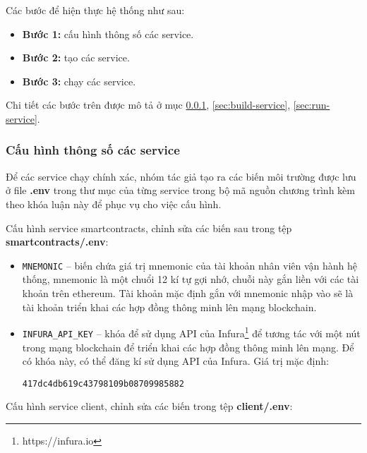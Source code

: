 \documentclass[../main-report.tex]{subfiles}
\begin{document}
Các bước để hiện thực hệ thống như sau:

\begin{itemize}
\item \textbf{Bước 1:} cấu hình thông số các \gls{service}.
\item \textbf{Bước 2:} tạo các \gls{service}.
\item \textbf{Bước 3:} chạy các \gls{service}.
\end{itemize}

Chi tiết các bước trên được mô tả ở mục \ref{sec:configure-service}, \ref{sec:build-service}, \ref{sec:run-service}.

\subsubsection{Cấu hình thông số các service}
\label{sec:configure-service}
Để các service chạy chính xác, nhóm tác giả tạo ra các biến môi trường được lưu ở file \textbf{.env} trong thư mục của từng service trong bộ mã nguồn chương trình kèm theo khóa luận này để phục vụ cho việc cấu hình.

Cấu hình service smartcontracts, chỉnh sửa các biến sau trong tệp \textbf{smartcontracts/.env}:

\begin{itemize}
\item \texttt{MNEMONIC} -- biến chứa giá trị mnemonic của tài khoản nhân viên vận hành hệ thống, mnemonic là một chuổi 12 kí tự gợi nhớ, chuỗi này gắn liền với các tài khoản trên ethereum. Tài khoản mặc định gắn với mnemonic nhập vào sẽ là tài khoản triển khai các hợp đồng thông minh lên mạng blockchain.
\item \texttt{INFURA\_API\_KEY} -- khóa để sử dụng API của Infura\footnote{https://infura.io} để tương tác với một nút trong mạng blockchain để triển khai các hợp đồng thông minh lên mạng. Để có khóa này, có thể đăng kí sử dụng API của Infura. Giá trị mặc định: 

\begin{lstlisting}
417dc4db619c43798109b08709985882
\end{lstlisting}
\end{itemize}

Cấu hình service client, chỉnh sửa các biến trong tệp \textbf{client/.env}:
\end{document}
